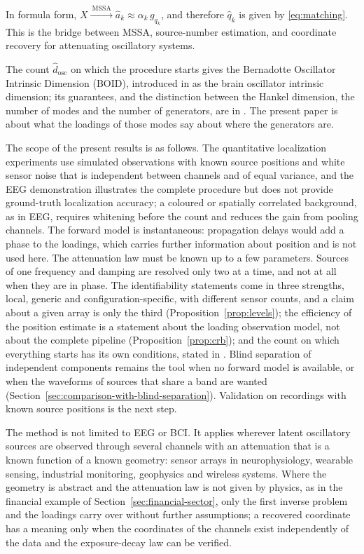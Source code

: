 \documentclass{article}
\begin{document}
In formula form, $X \xrightarrow{\ \mathrm{MSSA}\ } \widehat{a}_k \approx \alpha_k\, g_{q_k}$, and therefore $\widehat{q}_k$ is given by \eqref{eq:matching}. This is the bridge between MSSA, source-number estimation, and coordinate recovery for attenuating oscillatory systems.

The count $\widehat{d}_{\mathrm{osc}}$ on which the procedure starts gives the Bernadotte Oscillator Intrinsic Dimension (BOID), introduced in \cite{ref-Bernadotte07} as the brain oscillator intrinsic dimension; its guarantees, and the distinction between the Hankel dimension, the number of modes and the number of generators, are in \cite{ref-companionA}. The present paper is about what the loadings of those modes say about where the generators are.

The scope of the present results is as follows. The quantitative localization experiments use simulated observations with known source positions and white sensor noise that is independent between channels and of equal variance, and the EEG demonstration illustrates the complete procedure but does not provide ground-truth localization accuracy; a coloured or spatially correlated background, as in EEG, requires whitening before the count and reduces the gain from pooling channels. The forward model is instantaneous: propagation delays would add a phase to the loadings, which carries further information about position and is not used here. The attenuation law must be known up to a few parameters. Sources of one frequency and damping are resolved only two at a time, and not at all when they are in phase. The identifiability statements come in three strengths, local, generic and configuration-specific, with different sensor counts, and a claim about a given array is only the third (Proposition~\ref{prop:levels}); the efficiency of the position estimate is a statement about the loading observation model, not about the complete pipeline (Proposition~\ref{prop:crb}); and the count on which everything starts has its own conditions, stated in \cite{ref-companionA}. Blind separation of independent components remains the tool when no forward model is available, or when the waveforms of sources that share a band are wanted (Section~\ref{sec:comparison-with-blind-separation}). Validation on recordings with known source positions is the next step.

The method is not limited to EEG or BCI. It applies wherever latent oscillatory sources are observed through several channels with an attenuation that is a known function of a known geometry: sensor arrays in neurophysiology, wearable sensing, industrial monitoring, geophysics and wireless systems. Where the geometry is abstract and the attenuation law is not given by physics, as in the financial example of Section~\ref{sec:financial-sector}, only the first inverse problem and the loadings carry over without further assumptions; a recovered coordinate has a meaning only when the coordinates of the channels exist independently of the data and the exposure-decay law can be verified.
\end{document}
